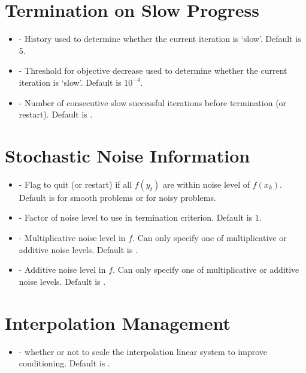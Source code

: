 \documentclass[letterpaper,10pt,english]{sphinxmanual}
\begin{document}
\section{Termination on Slow Progress}
\label{\detokenize{advanced:termination-on-slow-progress}}\begin{itemize}
\item {} 
 - History used to determine whether the current iteration is ‘slow’. Default is 5.

\item {} 
 - Threshold for objective decrease used to determine whether the current iteration is ‘slow’. Default is \(10^{-4}\).

\item {} 
 - Number of consecutive slow successful iterations before termination (or restart). Default is .

\end{itemize}


\section{Stochastic Noise Information}
\label{\detokenize{advanced:stochastic-noise-information}}\begin{itemize}
\item {} 
 - Flag to quit (or restart) if all \(f(y_t)\) are within noise level of \(f(x_k)\). Default is  for smooth problems or  for noisy problems.

\item {} 
 - Factor of noise level to use in termination criterion. Default is 1.

\item {} 
 - Multiplicative noise level in \(f\). Can only specify one of multiplicative or additive noise levels. Default is .

\item {} 
 - Additive noise level in \(f\). Can only specify one of multiplicative or additive noise levels. Default is .

\end{itemize}


\section{Interpolation Management}
\label{\detokenize{advanced:interpolation-management}}\begin{itemize}
\item {} 
 - whether or not to scale the interpolation linear system to improve conditioning. Default is .

\end{itemize}
\end{document}
